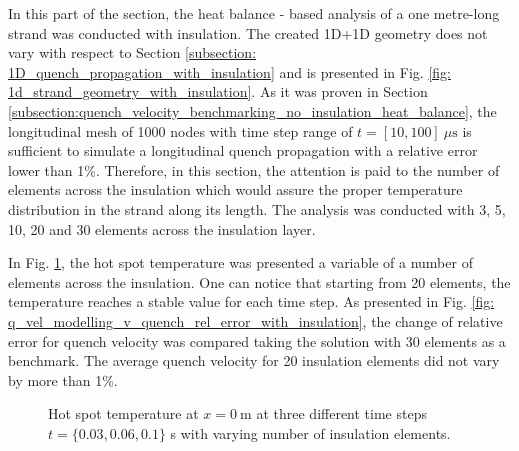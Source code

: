 
In this part of the section, the heat balance - based analysis of a one metre-long strand was conducted with insulation. The created 1D+1D geometry does not vary with respect to Section \ref{subsection: 1D_quench_propagation_with_insulation} and is presented in Fig. \ref{fig: 1d_strand_geometry_with_insulation}. As it was proven in Section \ref{subsection:quench_velocity_benchmarking_no_insulation_heat_balance}, the longitudinal mesh of 1000 nodes with time step range of $t=[10, 100]~\mu \text{s}$ is sufficient to simulate a longitudinal quench propagation with a relative error lower than 1\%. Therefore, in this section, the attention is paid to the number of elements across the insulation which would assure the proper temperature distribution in the strand along its length. The analysis was conducted with 3, 5, 10, 20 and 30 elements across the insulation layer.

In Fig. \ref{fig: q_vel_modelling_v_quench_hot_spot_temp_with_insulation}, the hot spot temperature was presented a variable of a number of elements across the insulation. One can notice that starting from 20 elements, the temperature reaches a stable value for each time step. As presented in Fig. \ref{fig: q_vel_modelling_v_quench_rel_error_with_insulation}, the change of relative error for quench velocity was compared taking the solution with 30 elements as a benchmark. The average quench velocity for 20 insulation elements did not vary by more than 1\%. 

\begin{figure}[h!]
\centering
    \caption{Hot spot temperature at $x = 0~\text{m}$ at three different time steps $t=\{0.03, 0.06, 0.1\}$ s with varying number of insulation elements.}
    \label{fig: q_vel_modelling_v_quench_hot_spot_temp_with_insulation}
\end{figure}

